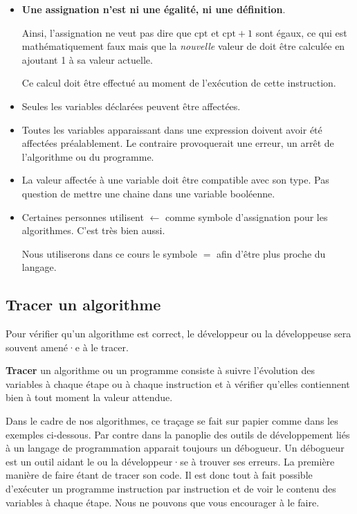 				\begin{itemize}
				\item 
					\textbf{Une assignation n’est ni une égalité, 
					ni une définition}.
					
					Ainsi, l’assignation  ne veut pas dire
					que $\textrm{cpt}$ et $\textrm{cpt} + 1$ sont égaux, ce qui
					est mathématiquement faux mais que la \emph{nouvelle} valeur
					de  doit être calculée en ajoutant 1 à sa valeur
					actuelle.  
					
					Ce calcul doit être effectué au moment de l'exécution
					de cette instruction. 
				
				\item 
					Seules les variables déclarées peuvent être affectées.
				\item 
					Toutes les variables apparaissant dans une expression
					doivent avoir été affectées préalablement. 
					Le contraire provoquerait une erreur,
					un arrêt de l’algorithme ou du programme.
				\item 
					La valeur affectée à une variable 
					doit être compatible avec son type.
					Pas question de mettre une chaine dans une variable
					booléenne.
				\item 
					Certaines personnes utilisent \textbf{$\leftarrow$} comme 
					symbole d'assignation pour les algorithmes. C'est très bien 
					aussi. 

					Nous utiliserons dans ce cours le symbole $=$ afin d'être plus
					proche du langage. 
				\end{itemize}
				
				\subsection{Tracer un algorithme}\label{tracer}
		
			Pour vérifier qu’un algorithme est correct,
			le développeur ou la développeuse sera souvent amené·e à 
			le tracer.

			\textbf{Tracer} un algorithme ou un programme consiste à suivre
			l’évolution des variables à chaque étape ou à chaque instruction
			et à vérifier qu’elles contiennent bien à tout moment la valeur
			attendue.

			Dans le cadre de nos algorithmes, ce traçage se fait sur papier
			comme dans les exemples ci-dessous. Par contre dans la panoplie des
			outils de développement liés à un langage de programmation apparait
			toujours un débogueur. Un débogueur est un outil
			aidant le ou la développeur·se à trouver ses erreurs. La première
			manière de faire étant de tracer son code. Il est donc tout à fait
			possible d'exécuter un programme instruction par instruction et de
			voir le contenu des variables à chaque étape. Nous ne pouvons que
			vous encourager à le faire. 
			
